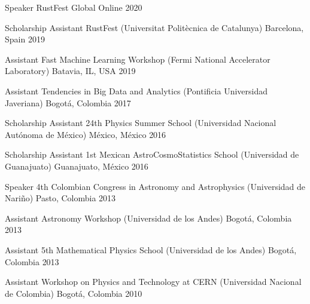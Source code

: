 


\begin{cvhonors}

    \cvhonor
    {Speaker}
    {RustFest Global}
    {Online}
    {2020}

    \cvhonor
    {Scholarship Assistant}
    {RustFest (Universitat Politècnica de Catalunya)}
    {Barcelona, Spain}
    {2019}

    \cvhonor
    {Assistant}
    {Fast Machine Learning Workshop (Fermi National Accelerator Laboratory)}
    {Batavia, IL, USA}
    {2019}

    \cvhonor
    {Assistant}
    {Tendencies in Big Data and Analytics (Pontificia Universidad Javeriana)}
    {Bogotá, Colombia}
    {2017}

    \cvhonor
    {Scholarship Assistant} %
    {24th Physics Summer School (Universidad Nacional Autónoma de México)} %
    {México, México} %
    {2016} %

    \cvhonor
    {Scholarship Assistant} %
    {1st Mexican AstroCosmoStatistics School (Universidad de Guanajuato)} %
    {Guanajuato, México} %
    {2016} %

    \cvhonor
    {Speaker} %
    {4th Colombian Congress in Astronomy and Astrophysics (Universidad de Nariño)} %
    {Pasto, Colombia} %
    {2013} %

    \cvhonor
    {Assistant} %
    {Astronomy Workshop (Universidad de los Andes)} %
    {Bogotá, Colombia} %
    {2013} %

    \cvhonor
    {Assistant} %
    {5th Mathematical Physics School (Universidad de los Andes)} %
    {Bogotá, Colombia} %
    {2013} %

    \cvhonor
    {Assistant} %
    {Workshop on Physics and Technology at CERN (Universidad Nacional de Colombia)} %
    {Bogotá, Colombia} %
    {2010} %

\end{cvhonors}
